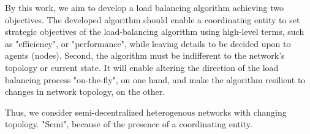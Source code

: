 By this work, we aim to develop a load balancing algorithm achieving two objectives.
The developed algorithm should enable a coordinating entity to set strategic objectives of the load-balancing algorithm using high-level terms, such as "efficiency", or "performance", while leaving details to be decided upon to agents (nodes).
Second, the algorithm must be indifferent to the network's topology or current state. It will enable altering the direction of the load balancing process "on-the-fly", on one hand, and make the algorithm resilient to changes in network topology, on the other.

Thus, we consider semi-decentralized heterogenous networks with changing topology. "Semi", because of the presence of a coordinating entity.
